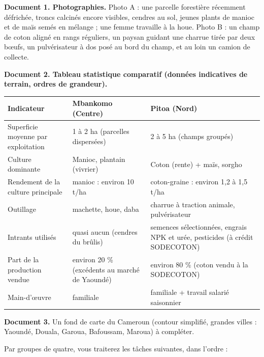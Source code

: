 \documentclass[11pt]{article}
\newcounter{popsec}
\newcounter{popsub}
\newcommand{\courssub}[1]{%
  \stepcounter{popsub}%
  \par\vspace{9pt}\noindent{\popxbold\fontsize{11.5}{13}\selectfont\color{popink}{\color{poporange}\thepopsec.\thepopsub}\hspace{6pt}#1}\par\nopagebreak\vspace{4pt}
}
\begin{document}
\textbf{Document 1. Photographies.}
Photo A : une parcelle forestière récemment défrichée, troncs calcinés encore visibles, cendres au sol, jeunes plants de manioc et de maïs semés en mélange ; une femme travaille à la houe. Photo B : un champ de coton aligné en rangs réguliers, un paysan guidant une charrue tirée par deux bœufs, un pulvérisateur à dos posé au bord du champ, et au loin un camion de collecte.

\textbf{Document 2. Tableau statistique comparatif (données indicatives de terrain, ordres de grandeur).}

\begin{center}
\begin{tabularx}{\linewidth}{|l|X|X|}
\hline
\rowcolor{popblueL} \textbf{Indicateur} & \textbf{Mbankomo (Centre)} & \textbf{Pitoa (Nord)} \\
\hline
Superficie moyenne par exploitation & 1 à 2 ha (parcelles dispersées) & 2 à 5 ha (champs groupés) \\
\hline
Culture dominante & Manioc, plantain (vivrier) & Coton (rente) + maïs, sorgho \\
\hline
Rendement de la culture principale & manioc : environ 10 t/ha & coton-graine : environ 1,2 à 1,5 t/ha \\
\hline
Outillage & machette, houe, daba & charrue à traction animale, pulvérisateur \\
\hline
Intrants utilisés & quasi aucun (cendres du brûlis) & semences sélectionnées, engrais NPK et urée, pesticides (à crédit SODECOTON) \\
\hline
Part de la production vendue & environ 20 \% (excédents au marché de Yaoundé) & environ 80 \% (coton vendu à la SODECOTON) \\
\hline
Main-d'œuvre & familiale & familiale + travail salarié saisonnier \\
\hline
\end{tabularx}
\end{center}

\textbf{Document 3.} Un fond de carte du Cameroun (contour simplifié, grandes villes : Yaoundé, Douala, Garoua, Bafoussam, Maroua) à compléter.

\courssub{Consignes}

Par groupes de quatre, vous traiterez les tâches suivantes, dans l'ordre :
\end{document}
